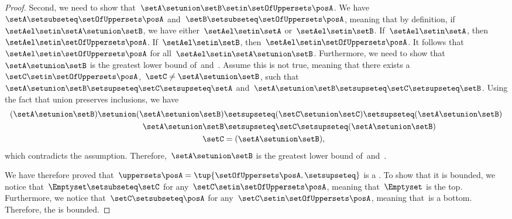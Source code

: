 \begin{proof}
    Second, we need to show that~$\setA\setunion \setB\setin \setOfUppersets \posA$.
    We have~$\setA\setsubseteq \setOfUppersets \posA$ and~$\setB \setsubseteq \setOfUppersets \posA$, meaning that by definition, if~$\setAel\setin \setA\setunion \setB$, we have either~$\setAel\setin \setA$ or~$\setAel\setin \setB$.
    If~$\setAel\setin \setA$, then~$\setAel\setin \setOfUppersets \posA$.
    If~$\setAel\setin \setB$, then~$\setAel \setin \setOfUppersets \posA$.
    It follows that~$\setAel \setin \setOfUppersets \posA$ for all~$\setAel\setin \setA\setunion \setB$.
    Furthermore, we need to show that~$\setA\setunion \setB$ is the greatest lower bound of~\setA and~\setB.
    Assume this is not true, meaning that there exists a~$\setC\setin \setOfUppersets \posA$,~$\setC\neq \setA\setunion \setB$, such that~$\setA\setunion \setB\setsupseteq \setC\setsupseteq \setA$ and~$\setA\setunion \setB\setsupseteq \setC\setsupseteq \setB$.
    Using the fact that union preserves inclusions, we have
    \begin{equation}
        \begin{aligned}
            (\setA\setunion \setB)
            \setunion (\setA\setunion \setB) & \setsupseteq (\setC \setunion \setC) \setsupseteq (\setA\setunion \setB) \\
            \setA\setunion \setB             & \setsupseteq \setC\setsupseteq (\setA\setunion \setB ) \\
            \setC                            & =(\setA\setunion \setB),
        \end{aligned}
    \end{equation}
    which contradicts the assumption.
    Therefore,~$\setA\setunion \setB$ is the greatest lower bound of~\setA and~\setB.

    We have therefore proved that~$\uppersets \posA=\tup{\setOfUppersets \posA,\setsupseteq}$ is a .
    To show that it is bounded, we notice that~$\Emptyset \setsubseteq \setC$ for any~$\setC\setin \setOfUppersets \posA$, meaning that~$\Emptyset$ is the top.
    Furthermore, we notice that~$\setC\setsubseteq \posA$ for any~$\setC\setin \setOfUppersets \posA$, meaning that~\posA is a bottom.
    Therefore, the  is bounded.
\end{proof}

